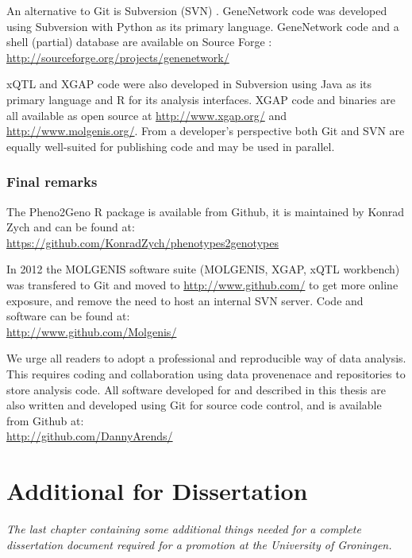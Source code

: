 An alternative to Git is Subversion (SVN) \cite{SVN:2002}. GeneNetwork code was developed 
using Subversion with Python as its primary language. GeneNetwork code and a shell (partial) 
database are available on Source Forge \cite{GeneNetwork:1994, GeneNetwork:2004}:\\
\url{http://sourceforge.org/projects/genenetwork/}

xQTL and XGAP code were also developed in Subversion \cite{SVN:2002} using Java as its primary language and 
R for its analysis interfaces. XGAP code and binaries are all available as open source at
\url{http://www.xgap.org/} and \url{http://www.molgenis.org/}. From a developer's perspective both Git and
SVN are equally well-suited for publishing code and may be used in parallel.

\subsection{Final remarks}
The Pheno2Geno R package is available from Github, it is maintained by Konrad Zych and can be found at:\\
\url{https://github.com/KonradZych/phenotypes2genotypes}

In 2012 the MOLGENIS software suite (MOLGENIS, XGAP, xQTL workbench) was transfered to Git and 
moved to \url{http://www.github.com/} to get more online exposure, and remove the need to host 
an internal SVN server. Code and software can be found at:\\
\url{http://www.github.com/Molgenis/}

We urge all readers to adopt a professional and reproducible way of data analysis. This requires 
coding and collaboration using data provenenace and repositories to store analysis code. All 
software developed for and described in this thesis are also written and developed using Git 
for source code control, and is available from Github at:\\
\url{http://github.com/DannyArends/}

\chapter{Additional for Dissertation}
\thispagestyle{empty}
\emph{The last chapter containing some additional things needed for a complete 
dissertation document required for a promotion at the University of Groningen.}
\null
\vfill
\newpage

